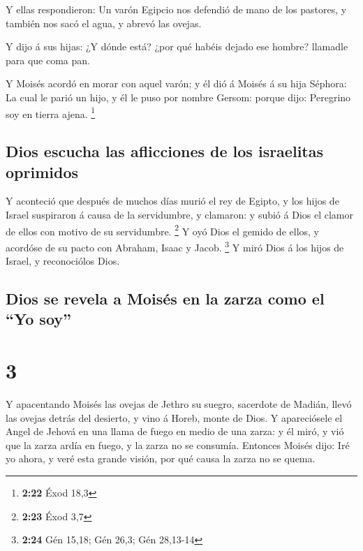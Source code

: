  Y ellas respondieron: Un varón Egipcio nos defendió de
mano de los pastores, y también nos sacó el agua, y abrevó las ovejas.

 Y dijo á sus hijas: ¿Y dónde está? ¿por qué habéis
dejado ese hombre? llamadle para que coma pan.

 Y Moisés acordó en morar con aquel varón; y él dió á
Moisés á su hija Séphora:  La cual le parió un hijo, y él
le puso por nombre Gersom: porque dijo: Peregrino soy en tierra ajena.
\footnote{\textbf{2:22} Éxod 18,3}

\hypertarget{dios-escucha-las-aflicciones-de-los-israelitas-oprimidos}{%
\subsection{Dios escucha las aflicciones de los israelitas
oprimidos}\label{dios-escucha-las-aflicciones-de-los-israelitas-oprimidos}}

 Y aconteció que después de muchos días murió el rey de
Egipto, y los hijos de Israel suspiraron á causa de la servidumbre, y
clamaron: y subió á Dios el clamor de ellos con motivo de su
servidumbre. \footnote{\textbf{2:23} Éxod 3,7}  Y oyó
Dios el gemido de ellos, y acordóse de su pacto con Abraham, Isaac y
Jacob. \footnote{\textbf{2:24} Gén 15,18; Gén 26,3; Gén 28,13-14}
 Y miró Dios á los hijos de Israel, y reconociólos Dios.

\hypertarget{dios-se-revela-a-moisuxe9s-en-la-zarza-como-el-yo-soy}{%
\subsection{Dios se revela a Moisés en la zarza como el ``Yo
soy''}\label{dios-se-revela-a-moisuxe9s-en-la-zarza-como-el-yo-soy}}

\hypertarget{section-2}{%
\section{3}\label{section-2}}

 Y apacentando Moisés las ovejas de Jethro su suegro,
sacerdote de Madián, llevó las ovejas detrás del desierto, y vino á
Horeb, monte de Dios.  Y apareciósele el Angel de Jehová
en una llama de fuego en medio de una zarza: y él miró, y vió que la
zarza ardía en fuego, y la zarza no se consumía.  Entonces
Moisés dijo: Iré yo ahora, y veré esta grande visión, por qué causa la
zarza no se quema.


